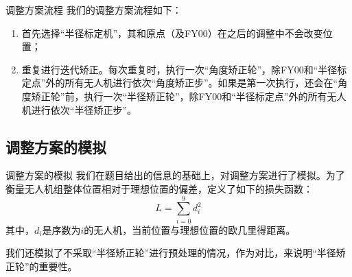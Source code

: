\documentclass[aspectratio=169]{beamer}
\begin{document}
\begin{frame}{调整方案流程}
    我们的调整方案流程如下：
    \begin{enumerate}
        \item 首先选择“半径标定机”，其和原点（及FY00）在之后的调整中不会改变位置；
        \item 重复进行迭代矫正。每次重复时，执行一次“角度矫正轮”，除FY00和“半径标定点”外的所有无人机进行依次“角度矫正步”。如果是第一次执行，还会在“角度矫正轮”前，执行一次“半径矫正轮”，除FY00和“半径标定点”外的所有无人机进行依次“半径矫正步”。
    \end{enumerate}
\end{frame}

\subsection{调整方案的模拟}

\begin{frame}{调整方案的模拟}
    我们在题目给出的信息的基础上，对调整方案进行了模拟。为了衡量无人机组整体位置相对于理想位置的偏差，定义了如下的损失函数：
    \begin{equation}
        L = \sum_{i=0}^{9} d_i^2
    \end{equation}
    其中，$d_i$是序数为$i$的无人机，当前位置与理想位置的欧几里得距离。

    我们还模拟了不采取“半径矫正轮”进行预处理的情况，作为对比，来说明“半径矫正轮”的重要性。
\end{frame}
\end{document}
